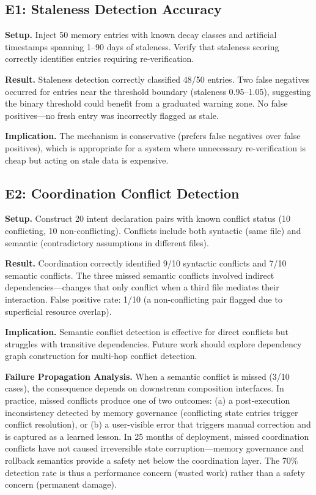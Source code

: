 \documentclass[11pt]{article}
\begin{document}
\subsection{E1: Staleness Detection Accuracy}

\textbf{Setup.} Inject 50 memory entries with known decay classes and artificial timestamps spanning 1--90 days of staleness. Verify that staleness scoring correctly identifies entries requiring re-verification.

\textbf{Result.} Staleness detection correctly classified 48/50 entries. Two false negatives occurred for entries near the threshold boundary (staleness 0.95--1.05), suggesting the binary threshold could benefit from a graduated warning zone. No false positives---no fresh entry was incorrectly flagged as stale.

\textbf{Implication.} The mechanism is conservative (prefers false negatives over false positives), which is appropriate for a system where unnecessary re-verification is cheap but acting on stale data is expensive.

\subsection{E2: Coordination Conflict Detection}

\textbf{Setup.} Construct 20 intent declaration pairs with known conflict status (10 conflicting, 10 non-conflicting). Conflicts include both syntactic (same file) and semantic (contradictory assumptions in different files).

\textbf{Result.} Coordination correctly identified 9/10 syntactic conflicts and 7/10 semantic conflicts. The three missed semantic conflicts involved indirect dependencies---changes that only conflict when a third file mediates their interaction. False positive rate: 1/10 (a non-conflicting pair flagged due to superficial resource overlap).

\textbf{Implication.} Semantic conflict detection is effective for direct conflicts but struggles with transitive dependencies. Future work should explore dependency graph construction for multi-hop conflict detection.

\textbf{Failure Propagation Analysis.} When a semantic conflict is missed (3/10 cases), the consequence depends on downstream composition interfaces. In practice, missed conflicts produce one of two outcomes: (a) a post-execution inconsistency detected by memory governance (conflicting state entries trigger conflict resolution), or (b) a user-visible error that triggers manual correction and is captured as a learned lesson. In 25 months of deployment, missed coordination conflicts have not caused irreversible state corruption---memory governance and rollback semantics provide a safety net below the coordination layer. The 70\% detection rate is thus a performance concern (wasted work) rather than a safety concern (permanent damage).
\end{document}
